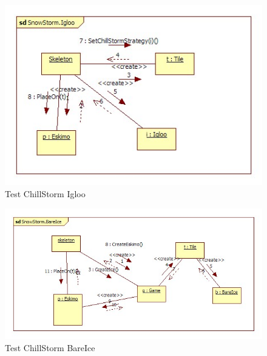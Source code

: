 \begin{figure}[h]
	\begin{center}
		\includegraphics[width=17cm]{chapters/chapter05/diagrams/Test_ChillStorm_Igloo_init.jpg}
		\caption{Test ChillStorm Igloo}
		\label{fig:Test ChillStorm Igloo}
	\end{center}
\end{figure}

\begin{figure}[h]
	\begin{center}
		\includegraphics[width=17cm]{chapters/chapter05/diagrams/Test_ChillStorm_BareIce_init.jpg}
		\caption{Test ChillStorm BareIce}
		\label{fig:Test ChillStorm BareIce}
	\end{center}
\end{figure}

